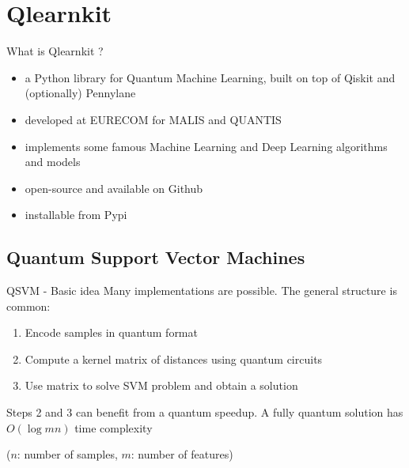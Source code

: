 \graphicspath{{assets/qlearnkit/}}

\section{Qlearnkit}
\begin{frame}{What is Qlearnkit ?}
\begin{itemize}
    \item a Python library for \alert{Quantum Machine Learning}, built on top of \alert{Qiskit} and (optionally) \alert{Pennylane}
    \item developed at EURECOM for \alert{MALIS} and \alert{QUANTIS}
    \item implements some famous Machine Learning and Deep Learning algorithms and models
    \item open-source and available on Github
    \item installable from Pypi
\end{itemize}
\end{frame}


\subsection{Quantum Support Vector Machines}


\begin{frame}{QSVM - Basic idea}
    Many implementations are possible. The general structure is common:
    \begin{enumerate}
        \item Encode samples in quantum format
        \item Compute a kernel matrix of distances using quantum circuits
        \item Use matrix to solve SVM problem and obtain a solution
    \end{enumerate}
    Steps 2 and 3 can benefit from a quantum speedup. A fully quantum solution has $O(\log mn)$ time complexity 
    
    ($n$: number of samples, $m$: number of features)
\end{frame}

